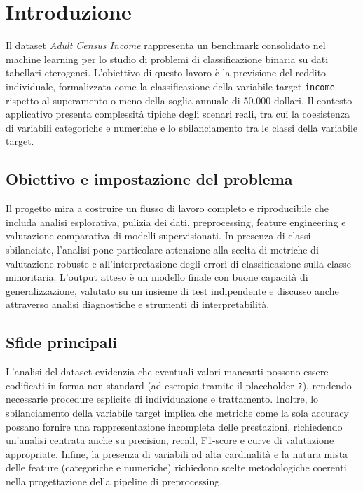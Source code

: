 \documentclass[a4paper,11pt]{article}
\begin{document}
\newpage
\tableofcontents
\newpage









\section{Introduzione}

Il dataset \textit{Adult Census Income} rappresenta un benchmark consolidato nel machine learning per lo studio di problemi di classificazione binaria su dati tabellari eterogenei. 
L’obiettivo di questo lavoro è la previsione del reddito individuale, formalizzata come la classificazione della variabile target \texttt{income} rispetto al superamento o meno della soglia annuale di 50.000 dollari. 
Il contesto applicativo presenta complessità tipiche degli scenari reali, tra cui la coesistenza di variabili categoriche e numeriche e lo sbilanciamento tra le classi della variabile target. 

\subsection{Obiettivo e impostazione del problema}
Il progetto mira a costruire un flusso di lavoro completo e riproducibile che includa analisi esplorativa, pulizia dei dati, preprocessing, feature engineering e valutazione comparativa di modelli supervisionati. 
In presenza di classi sbilanciate, l’analisi pone particolare attenzione alla scelta di metriche di valutazione robuste e all’interpretazione degli errori di classificazione sulla classe minoritaria. 
L’output atteso è un modello finale con buone capacità di generalizzazione, valutato su un insieme di test indipendente e discusso anche attraverso analisi diagnostiche e strumenti di interpretabilità. 

\subsection{Sfide principali}
L’analisi del dataset evidenzia che eventuali valori mancanti possono essere codificati in forma non standard (ad esempio tramite il placeholder \texttt{?}), rendendo necessarie procedure esplicite di individuazione e trattamento. 
Inoltre, lo sbilanciamento della variabile target implica che metriche come la sola accuracy possano fornire una rappresentazione incompleta delle prestazioni, richiedendo un’analisi centrata anche su precision, recall, F1-score e curve di valutazione appropriate. 
Infine, la presenza di variabili ad alta cardinalità e la natura mista delle feature (categoriche e numeriche) richiedono scelte metodologiche coerenti nella progettazione della pipeline di preprocessing. 
\end{document}
